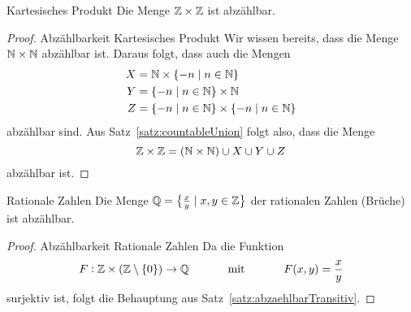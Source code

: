 \begin{corollary}{Kartesisches Produkt}
Die Menge $\mathbb{Z}\times \mathbb{Z}$ ist abzählbar.
\end{corollary}
\begin{proof}{Abzählbarkeit Kartesisches Produkt}
Wir wissen bereits, dass die Menge $\mathbb{N}\times\mathbb{N}$ abzählbar ist. Daraus folgt, dass auch die Mengen
\begin{align*}
X&=\mathbb{N}\times\{-n\mid n\in \mathbb{N}\}\\
Y&=\{-n\mid n\in \mathbb{N}\}\times\mathbb{N} \\
Z&=\{-n\mid n\in \mathbb{N}\}\times\{-n\mid n\in \mathbb{N}\}
\end{align*}
abzählbar sind. Aus Satz~\ref{satz:countableUnion} folgt also, dass die Menge
\[
\mathbb{Z}\times\mathbb{Z}=(\mathbb{N}\times\mathbb{N})\cup X\cup Y\cup Z
\]
abzählbar ist.
\end{proof}

\begin{corollary}{Rationale Zahlen}
Die Menge $\mathbb{Q}=\big\{\frac{x}{y}\mid x,y\in \mathbb{Z}\big\}$ der rationalen Zahlen (Brüche) ist abzählbar.
\end{corollary}
\begin{proof}{Abzählbarkeit Rationale Zahlen}
Da die Funktion
\[
F:\mathbb{Z}\times(\mathbb{Z}\setminus{\{0\}})\to \mathbb{Q}\phantom{abstand}\text{mit}\phantom{abstand}F(x,y)=\frac{x}{y}
\]
surjektiv ist, folgt die Behauptung aus Satz~\ref{satz:abzaehlbarTransitiv}.
\end{proof}



